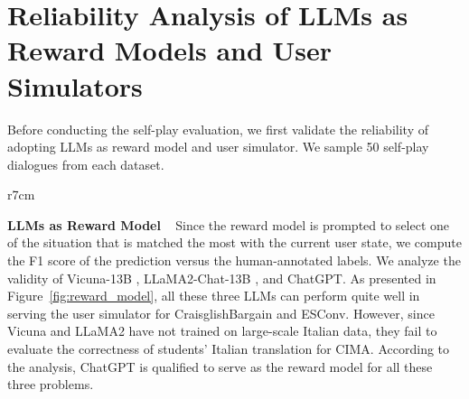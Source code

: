 \documentclass{article} %
\begin{document}
\clearpage




\clearpage

\appendix

\section{Reliability Analysis of LLMs as Reward Models and User Simulators}\label{app:preliminary}

Before conducting the self-play evaluation, we first validate the reliability of adopting LLMs as reward model and user simulator. We sample 50 self-play dialogues from each dataset.  

\begin{wrapfigure}{r}{7cm}
 \centering
 \caption{Analysis of LLMs as reward model.}
 \label{fig:reward_model}
\end{wrapfigure} 

\noindent \textbf{LLMs as Reward Model} ~ Since the reward model is prompted to select one of the situation that is matched the most with the current user state, we compute the F1 score of the prediction versus the human-annotated labels. 
We analyze the validity of Vicuna-13B \citep{vicuna2023}, LLaMA2-Chat-13B \citep{llama2}, and ChatGPT. 
As presented in Figure~\ref{fig:reward_model}, all these three LLMs can perform quite well in serving the user simulator for CraisglishBargain and ESConv. However, since Vicuna and LLaMA2 have not trained on large-scale Italian data, they fail to evaluate the correctness of students' Italian translation for CIMA. 
According to the analysis, ChatGPT is qualified to serve as the reward model for all these three problems.
\end{document}
